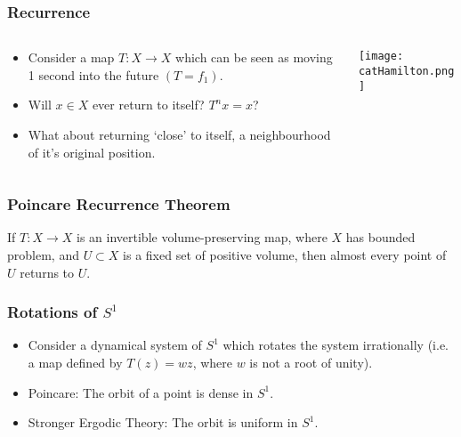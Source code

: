\documentclass{beamer}
\begin{document}
\begin{frame}
\frametitle{Recurrence}
\begin{columns}
\begin{column}{.6\textwidth}
\begin{itemize}
    \item<1-> Consider a map $T: X \to X$ which can be seen as moving 1 second into the future $(T = f_1)$.
    \item<2-> Will $x \in X$ ever return to itself? $T^n x = x$?
    \item<3-> What about returning `close' to itself, a neighbourhood of it's original position.
\end{itemize}
\end{column}
\begin{column}{.4\textwidth}
\texttt{[image: catHamilton.png]}
\end{column}
\end{columns}
\end{frame}

\begin{frame}
\frametitle{Poincare Recurrence Theorem}
\begin{theorem}
    If $T:X \to X$ is an invertible volume-preserving map, where $X$ has bounded problem, and $U \subset X$ is a fixed set of positive volume, then almost every point of $U$ returns to $U$.
\end{theorem}
\end{frame}

\begin{frame}
\frametitle{Rotations of $S^1$}
\begin{itemize}
    \item<1-> Consider a dynamical system of $S^1$ which rotates the system irrationally (i.e. a map defined by $T(z) = wz$, where $w$ is not a root of unity).
    \item<2-> Poincare: The orbit of a point is dense in $S^1$.
    \item<3-> Stronger Ergodic Theory: The orbit is uniform in $S^1$.
\end{itemize}
\end{frame}
\end{document}
